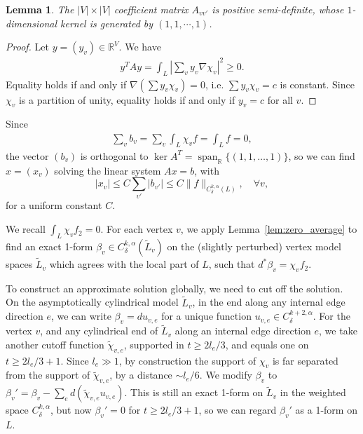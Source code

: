 \documentclass{article}
\newtheorem{lem}[thm]{Lemma}
\theoremstyle{definition}
\begin{document}
	
	\begin{lem}
		The $|V|\times |V|$ coefficient matrix
		$A_{vv'} $ is positive
		semi-definite, whose $1$-dimensional kernel is generated by $(1,1, \cdots, 1)$.
	\end{lem}
	
	\begin{proof}
		Let $y=(y_v) \in \mathbb{R}^{V}$. We have
		\begin{align*}
			y^TAy = \int_{L} |\sum_v y_v\nabla \chi_v|^2 \ge 0.
		\end{align*}
		Equality holds if and only if $\nabla(\sum y_v\chi_v) = 0$, i.e.
		$\sum y_v\chi_v = c$ is constant. Since $\chi_v$ is a partition of
		unity, equality holds if and only if $y_v = c$ for all $v$.
	\end{proof}
	
	Since
	\begin{align*}
		\sum_v b_v 
		= \sum_v \int_{L} \chi_v f 
		= \int_{L} f
		= 0,
	\end{align*}
	the vector $(b_v)$ is orthogonal to
	$\operatorname{ker} A^T =
	\operatorname{span}_{\mathbb{R}}\{(1,1,\ldots,1)\}$, so we can find $x=(x_v)$ solving
	the linear system $Ax=b$, with
	\begin{equation}
		|x_v|\le C\sum_{v'} |b_{v'}| \leq C\|f\|_{C^{k,\alpha}_\delta(L)},\quad \forall v,
	\end{equation}
	for a uniform constant $C$.
	
	
	
	We recall $\int_{L} \chi_v f_2=0$. For each vertex $v$, we apply Lemma~\ref{lem:zero_average} to find an exact 1-form $\beta_v\in C^{k,\alpha}_\delta(\tilde{L}_v)$ on the (slightly perturbed) vertex model spaces $\tilde{L}_v$ which agrees with the local part of $L$, such that 
	$d^* \beta_v= \chi_v f_2$. 
	
	
	To construct an approximate solution globally, we need to cut off the solution. On the asymptotically cylindrical model $\tilde{L}_v$, in the end along any internal edge direction $e$, we can write
	$
	\beta_v= du_{v,e}$ for a unique function $ u_{v,e}\in C^{k+2,\alpha}_\delta.
	$
	For the vertex $v$, and any cylindrical end of $\tilde{L}_v$ along an internal edge direction $e$, we take another cutoff function $\tilde{\chi}_{v,e}$, supported in $t\geq 2l_e/3$, and equals one on $t\geq 2l_e/3+1$. Since $l_e\gg 1$, by construction the support of $\chi_v$ is far separated from the support of $\tilde{\chi}_{v,e}$, by a distance $\sim l_e/6$. We modify $\beta_v$ to $\beta_v'=\beta_v- \sum_e d(\tilde{\chi}_{v,e} u_{v,e})$. This is still an exact 1-form on $\tilde{L}_v$ in the weighted space $C^{k,\alpha}_\delta$, but now $\beta_v'=0$ for $t\geq 2l_e/3+1$, so we can regard $\beta_v'$ as a 1-form on $L$.  
	
\end{document}
